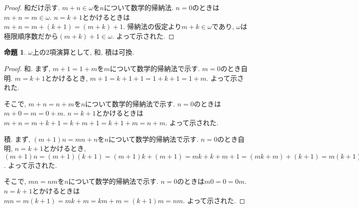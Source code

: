 \documentclass[a4paper, twoside]{bxjsarticle}
\theoremstyle{definition}
\newtheorem{prop}[thm]{命題}
\begin{document}
        \begin{proof}
            和だけ示す. $m+n\in\omega$を$n$について数学的帰納法. $n=0$のときは$m+n=m\in\omega$. $n=k+1$とかけるときは$m+n=m+(k+1)=(m+k)+1$. 帰納法の仮定より$m+k\in\omega$であり, $\omega$は極限順序数だから$(m+k)+1\in\omega$. よって示された.
        \end{proof}
        \begin{prop}
            $\omega$上の2項演算として, 和, 積は可換.
        \end{prop}
        \begin{proof}
            和. まず, $m+1=1+m$を$m$について数学的帰納法で示す. $m=0$のとき自明. $m=k+1$とかけるとき, $m+1=k+1+1=1+k+1=1+m$. よって示された. 
            
            そこで, $m+n=n+m$を$n$について数学的帰納法で示す. $n=0$のときは$m+0=m=0+m$. $n=k+1$とかけるときは$m+n=m+k+1=k+m+1=k+1+m=n+m$. よって示された.
            
            積. まず, $(m+1)n=mn+n$を$n$について数学的帰納法で示す. $n=0$のとき自明, $n=k+1$とかけるとき, $(m+1)n=(m+1)(k+1)=(m+1)k+(m+1)=mk+k+m+1=(mk+m)+(k+1)=m(k+1)+(k+1)=mn+n$. よって示された.
            
            そこで, $mn=nm$を$n$について数学的帰納法で示す. $n=0$のときは$m0=0=0m$. $n=k+1$とかけるときは$mn=m(k+1)=mk+m=km+m=(k+1)m=nm$. よって示された.
        \end{proof}
        
\end{document}
